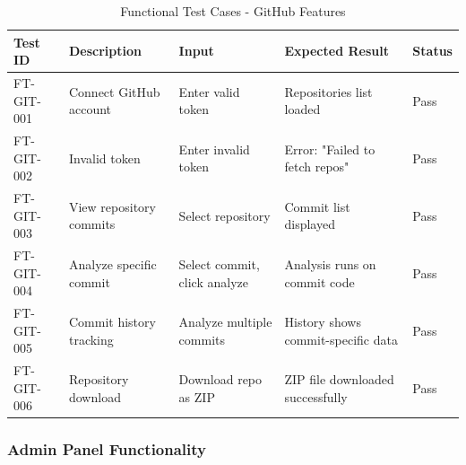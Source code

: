 \documentclass[12pt,a4paper]{article}
\begin{document}
    \begin{table}[H]
        \caption{Functional Test Cases - GitHub Features}
        \begin{tabular}{|p{2cm}|p{4cm}|p{3cm}|p{3cm}|p{1.5cm}|}
            \hline
            \textbf{Test ID} & \textbf{Description} & \textbf{Input} & \textbf{Expected Result} & \textbf{Status} \\
            \hline
            FT-GIT-001 & Connect GitHub account & Enter valid token & Repositories list loaded & Pass \\
            \hline
            FT-GIT-002 & Invalid token & Enter invalid token & Error: "Failed to fetch repos" & Pass \\
            \hline
            FT-GIT-003 & View repository commits & Select repository & Commit list displayed & Pass \\
            \hline
            FT-GIT-004 & Analyze specific commit & Select commit, click analyze & Analysis runs on commit code & Pass \\
            \hline
            FT-GIT-005 & Commit history tracking & Analyze multiple commits & History shows commit-specific data & Pass \\
            \hline
            FT-GIT-006 & Repository download & Download repo as ZIP & ZIP file downloaded successfully & Pass \\
            \hline
        \end{tabular}
    \end{table}

    \subsubsection{Admin Panel Functionality}
\end{document}
